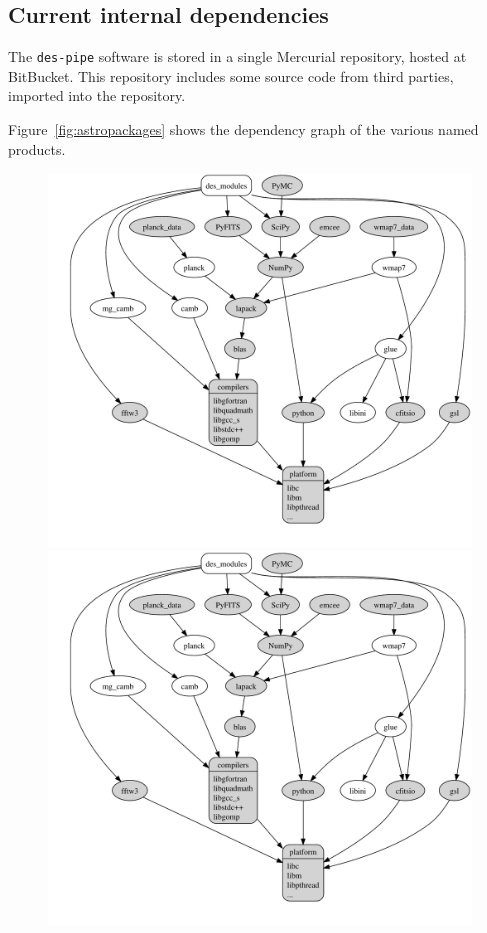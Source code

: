 \documentclass[draftmode,draftwater]{memarticle}
\begin{document}
\subsection{Current internal dependencies}

The \texttt{des-pipe} software is stored in a single
Mercurial\cite{mercurial} repository, hosted at
BitBucket\cite{bitbucket}. This repository includes some source code
from third parties, imported into the repository.

Figure~\ref{fig:astropackages} shows the dependency graph of the various
named products.

\begin{figure}
  \centering
{%
  \includegraphics[width=0.95\textheight]{astro_packages}
}{%
  \includegraphics[width=\textwidth]{astro_packages}
}
\end{figure}
\end{document}
